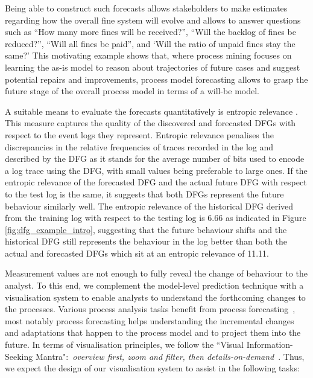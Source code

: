 Being able to construct such forecasts allows stakeholders to make estimates regarding how the overall fine system will evolve and allows to answer questions such as ``How many more fines will be received?'', ``Will the backlog of fines be reduced?'', ``Will all fines be paid'', and `Will the ratio of unpaid fines stay the same?'
This motivating example shows that, where process mining focuses on learning the as-is model to reason about trajectories of future cases and suggest potential repairs and improvements, process model forecasting allows to grasp the future stage of the overall process model in terms of a will-be model. %

A suitable means to evaluate the forecasts quantitatively is entropic relevance \cite{DBLP:conf/icpm/PolyvyanyyMG20}. This measure captures the quality of the discovered and forecasted DFGs with respect to the event logs they represent. 
Entropic relevance penalises the discrepancies in the relative frequencies of traces recorded in the log and described by the DFG as it stands for the average number of bits used to encode a log trace using the DFG, with small values being preferable to large ones.
If the entropic relevance of the forecasted DFG and the actual future DFG with respect to the test log is the same, it suggests that both DFGs represent the future behaviour similarly well. 
The entropic relevance of the historical DFG derived from the training log with respect to the testing log is 6.66 as indicated in Figure \ref{fig:dfg_example_intro}, 
suggesting that the future behaviour shifts and the historical DFG still represents the behaviour in the log better than both the actual and forecasted DFGs which sit at an entropic relevance of 11.11. 

Measurement values are not enough to fully reveal the change of behaviour to the analyst. To this end, we complement the model-level prediction technique with a visualisation system to enable analysts to understand the forthcoming changes to the processes. Various process analysis tasks benefit from process forecasting~\cite{DBLP:conf/bpm/PollPRRR18}, most notably process forecasting helps understanding the incremental changes and adaptations that happen to the process model and to project them into the future. In terms of visualisation principles, we follow the ``Visual Information-Seeking Mantra":~\emph{overview first, zoom and filter, then details-on-demand}~\cite{DBLP:conf/vl/Shneiderman96}. 
Thus, we expect the design of our visualisation system to assist in the following tasks:

